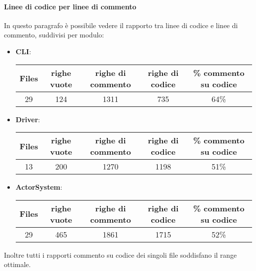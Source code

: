 \documentclass{scalatekids-article}
\begin{document}
\paragraph{Linee di codice per linee di commento}
In questo paragrafo è possibile vedere il rapporto tra linee di codice e
linee di commento, suddivisi per modulo:
\begin{itemize}
	
	\item \textbf{CLI}:
	\begin{center}
		\begin{tabular}{| c | c | c | c | c |}
			\hline
			Files & righe vuote & righe di commento & righe di codice & \% commento su codice\\
			\hline
			29 & 124 & 1311 & 735 & 64\% \\
			\hline
		\end{tabular}
	\end{center}
	
	\item \textbf{Driver}:
	\begin{center}
		\begin{tabular}{| c | c | c | c | c |}
			\hline
			Files & righe vuote & righe di commento & righe di codice & \% commento su codice\\
			\hline
			13 & 200 & 1270 & 1198 & 51\% \\
			\hline
		\end{tabular}
	\end{center}
	
	\item \textbf{ActorSystem}:
	\begin{center}
		\begin{tabular}{| c | c | c | c | c |}
			\hline
			Files & righe vuote & righe di commento & righe di codice & \% commento su codice\\
			\hline
			29 & 465 & 1861 & 1715 & 52\% \\
			\hline
		\end{tabular}
	\end{center}
\end{itemize}

Inoltre tutti i rapporti commento su codice dei singoli file soddisfano il range ottimale.
\end{document}

